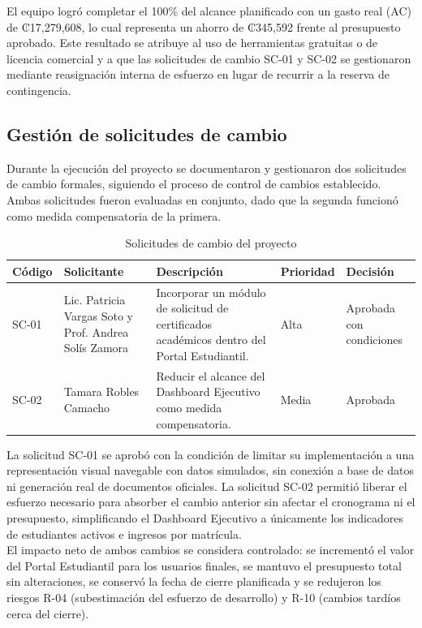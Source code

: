 \documentclass[11pt,spanish]{article}
\begin{document}
El equipo logró completar el 100\% del alcance planificado con un gasto real (AC) de ₡17,279,608, lo cual representa un ahorro de ₡345,592 frente al presupuesto aprobado. Este resultado se atribuye al uso de herramientas gratuitas o de licencia comercial y a que las solicitudes de cambio SC-01 y SC-02 se gestionaron mediante reasignación interna de esfuerzo en lugar de recurrir a la reserva de contingencia.

\subsection{Gestión de solicitudes de cambio}

Durante la ejecución del proyecto se documentaron y gestionaron dos solicitudes de cambio formales, siguiendo el proceso de control de cambios establecido. Ambas solicitudes fueron evaluadas en conjunto, dado que la segunda funcionó como medida compensatoria de la primera.

\begin{table}[H]
\centering
\caption{Solicitudes de cambio del proyecto}
\label{tab:cambios}
{\small
\begin{tabularx}{\textwidth}{p{1.5cm}p{3cm}Yp{1.7cm}p{2cm}}
\toprule
\textbf{Código} &
\textbf{Solicitante} &
\textbf{Descripción} &
\textbf{Prioridad} &
\textbf{Decisión} \\
\midrule

SC-01 &
Lic. Patricia Vargas Soto y Prof. Andrea Solís Zamora &
Incorporar un módulo de solicitud de certificados académicos dentro del Portal Estudiantil.
&
Alta &
Aprobada con condiciones
\\

SC-02 &
Tamara Robles Camacho &
Reducir el alcance del Dashboard Ejecutivo como medida compensatoria.
&
Media &
Aprobada
\\

\bottomrule
\end{tabularx}
}
\end{table}

La solicitud SC-01 se aprobó con la condición de limitar su implementación a una representación visual navegable con datos simulados, sin conexión a base de datos ni generación real de documentos oficiales. La solicitud SC-02 permitió liberar el esfuerzo necesario para absorber el cambio anterior sin afectar el cronograma ni el presupuesto, simplificando el Dashboard Ejecutivo a únicamente los indicadores de estudiantes activos e ingresos por matrícula.\\
El impacto neto de ambos cambios se considera controlado: se incrementó el valor del Portal Estudiantil para los usuarios finales, se mantuvo el presupuesto total sin alteraciones, se conservó la fecha de cierre planificada y se redujeron los riesgos R-04 (subestimación del esfuerzo de desarrollo) y R-10 (cambios tardíos cerca del cierre).
\end{document}
